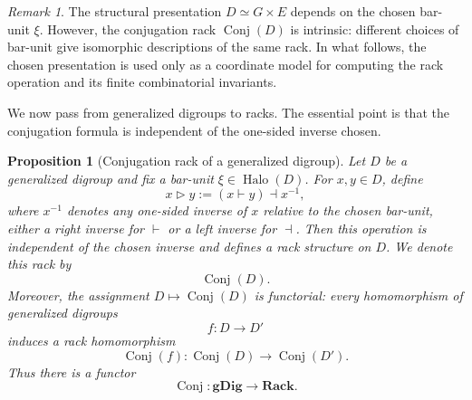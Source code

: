\documentclass[11pt]{article}
\theoremstyle{plain}
\newtheorem{proposition}[theorem]{Proposition}
\theoremstyle{definition}
\theoremstyle{remark}
\newtheorem{remark}[theorem]{Remark}
\DeclareMathOperator{\Conj}{Conj}
\DeclareMathOperator{\Halo}{Halo}
\begin{document}
	\begin{remark}\label{rem:choice-of-bar-unit}
		The structural presentation \(D\simeq G\times E\) depends on the chosen
		bar-unit \(\xi\). However, the conjugation rack \(\Conj(D)\) is intrinsic:
		different choices of bar-unit give isomorphic descriptions of the same rack.
		In what follows, the chosen presentation is used only as a coordinate model
		for computing the rack operation and its finite combinatorial invariants.
	\end{remark}
	
	We now pass from generalized digroups to racks. The essential point is that
	the conjugation formula is independent of the one-sided inverse chosen.
	
	\begin{proposition}[Conjugation rack of a generalized digroup]\label{prop:conj-rack-gdigroup}
		Let \(D\) be a generalized digroup and fix a bar-unit
		\(\xi\in\Halo(D)\). For \(x,y\in D\), define
		\[
		x\triangleright y
		:=
		(x\vdash y)\dashv x^{-1},
		\]
		where \(x^{-1}\) denotes any one-sided inverse of \(x\) relative to the chosen
		bar-unit, either a right inverse for \(\vdash\) or a left inverse for \(\dashv\).
		Then this operation is independent of the chosen inverse and defines a rack
		structure on \(D\). We denote this rack by
		\[
		\Conj(D).
		\]
		Moreover, the assignment \(D\mapsto \Conj(D)\) is functorial:
		every homomorphism of generalized digroups
		\[
		f:D\longrightarrow D'
		\]
		induces a rack homomorphism
		\[
		\Conj(f):\Conj(D)\longrightarrow\Conj(D').
		\]
		Thus there is a functor
		\[
		\Conj:\mathbf{gDig}\longrightarrow\mathbf{Rack}.
		\]
	\end{proposition}
	
\end{document}
